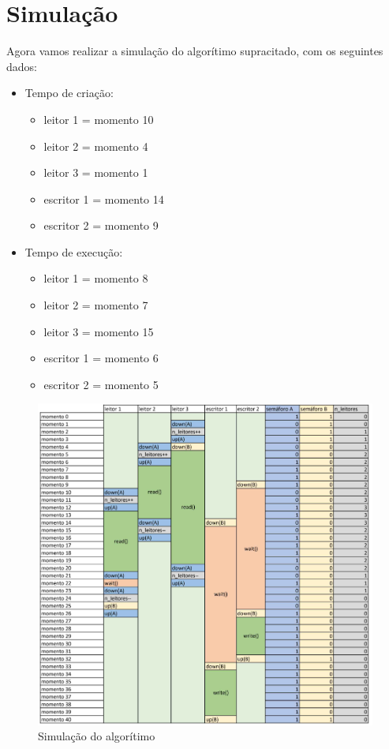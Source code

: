 \documentclass[12pt, a4paper]{article}
\begin{document}
\section{Simulação}

Agora vamos realizar a simulação do algorítimo supracitado, com os seguintes dados:

\begin{multicols}{2}
\begin{itemize}
\footnotesize
	\item Tempo de criação:
	\begin{itemize}
			\item leitor 1 = momento 10
			\item leitor 2 = momento 4
			\item leitor 3 = momento 1
			\item escritor 1 = momento 14
			\item escritor 2 = momento 9
	\end{itemize}
	\item Tempo de execução:
		\begin{itemize}
			\item leitor 1 = momento 8
			\item leitor 2 = momento 7
			\item leitor 3 = momento 15
			\item escritor 1 = momento 6
			\item escritor 2 = momento 5
		\end{itemize}
\end{itemize}
\end{multicols}

%



\begin{figure}[!htb]
	\centering
	\includegraphics[keepaspectratio,scale=.5]{silulation.png}
	\caption{\label{fig:silulation.png}Simulação do algorítimo}
\end{figure}
\end{document}
